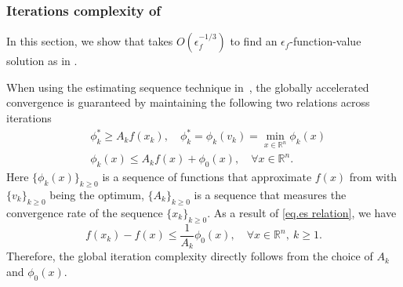 \documentclass{article}
\begin{document}
\subsubsection{Iterations complexity of }
In this section, we show that  takes $O(\epsilon_f^{-1/3})$ to find an $\epsilon_f$-function-value solution as in .

When using the estimating sequence technique in~\cite{nesterov2008accelerating}, the globally accelerated convergence is guaranteed by maintaining the following two relations across iterations
\begin{subequations}\label{eq.es relation}
    \begin{align}
        \label{eq.es relation 1}
         & \phi_k^*  \geq A_k f(x_k), \quad  \phi_k^*= \phi_k(v_k) =\min_{x\in\mathbb{R}^n}\phi_k(x) \\
        \label{eq.es relation 2}
         & \phi_k(x)\leq A_kf(x)+\phi_0(x), \quad \forall x\in\mathbb{R}^n.
    \end{align}
\end{subequations}
Here $\{\phi_k(x)\}_{k\geq 0}$ is a sequence of functions that approximate $f(x)$ from with $\{v_k\}_{k\geq0}$ being the optimum, $\{A_k\}_{k\geq 0}$ is a sequence that measures the convergence rate of the sequence $\{x_k\}_{k\geq 0}$. As a result of \eqref{eq.es relation}, we have
\begin{equation*}
    f(x_k)-f(x)\leq \frac{1}{A_k}\phi_0(x),\quad \forall x\in \mathbb{R}^n, \  k\geq 1.
\end{equation*}
Therefore, the global iteration complexity directly follows from the choice of $A_k$ and $\phi_0(x)$.
\end{document}
